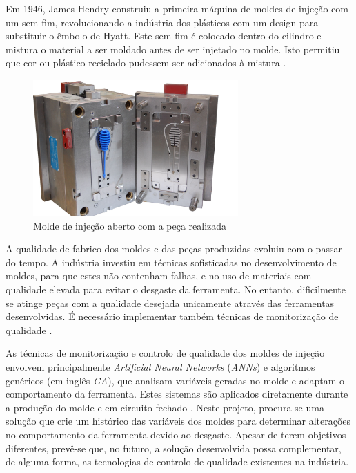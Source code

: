 \documentclass[11pt,twoside,a4paper]{report}
\begin{document}
Em 1946, James Hendry construiu a primeira máquina de moldes de injeção com um sem fim, revolucionando a indústria dos plásticos com um design para substituir o êmbolo de Hyatt. Este sem fim é colocado dentro do cilindro e mistura o material a ser moldado antes de ser injetado no molde. Isto permitiu que cor ou plástico reciclado pudessem ser adicionados à mistura \cite{historia,patente1946}.\par
\begin{figure}[H]
	\begin{center}
		\includegraphics[width=0.70\textwidth]{molde} %
		\caption[Molde de injeção]{Molde de injeção aberto com a peça realizada \footnotemark}
		\label{fig:molde}
	\end{center}
\end{figure}
A qualidade de fabrico dos moldes e das peças produzidas evoluiu com o passar do tempo. A indústria investiu em técnicas sofisticadas no desenvolvimento de moldes, para que estes não contenham falhas, e no uso de materiais com qualidade elevada para evitar o desgaste da ferramenta. No entanto, dificilmente se atinge peças com a qualidade desejada unicamente através das ferramentas desenvolvidas. É necessário implementar também técnicas de monitorização de qualidade \cite{Woll}.\par 
As técnicas de monitorização e controlo de qualidade dos moldes de injeção envolvem principalmente \textit{Artificial Neural Networks} (\textit{ANNs}) e algoritmos genéricos (em inglês \textit{GA}), que analisam variáveis geradas no molde e adaptam o comportamento da ferramenta. Estes sistemas são aplicados diretamente durante a produção do molde e em circuito fechado \cite{Cook,Woll}. Neste projeto, procura-se uma solução que crie um histórico das variáveis dos moldes para determinar alterações no comportamento da ferramenta devido ao desgaste. Apesar de terem objetivos diferentes, prevê-se que, no futuro, a solução desenvolvida possa complementar, de alguma forma, as tecnologias de controlo de qualidade existentes na indústria.
\end{document}
